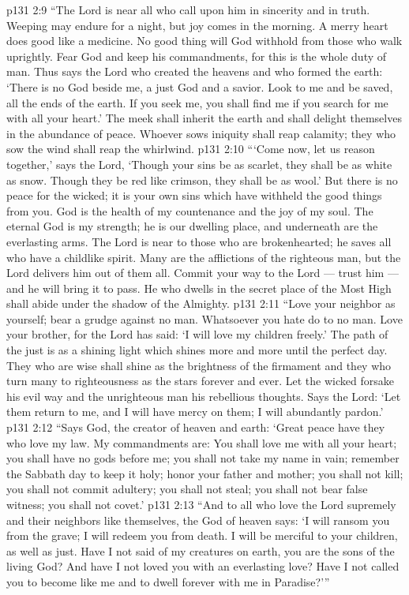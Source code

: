 \vs p131 2:9 “The Lord is near all who call upon him in sincerity and in truth. Weeping may endure for a night, but joy comes in the morning. A merry heart does good like a medicine. No good thing will God withhold from those who walk uprightly. Fear God and keep his commandments, for this is the whole duty of man. Thus says the Lord who created the heavens and who formed the earth: ‘There is no God beside me, a just God and a savior. Look to me and be saved, all the ends of the earth. If you seek me, you shall find me if you search for me with all your heart.’ The meek shall inherit the earth and shall delight themselves in the abundance of peace. Whoever sows iniquity shall reap calamity; they who sow the wind shall reap the whirlwind.
\vs p131 2:10 “‘Come now, let us reason together,’ says the Lord, ‘Though your sins be as scarlet, they shall be as white as snow. Though they be red like crimson, they shall be as wool.’ But there is no peace for the wicked; it is your own sins which have withheld the good things from you. God is the health of my countenance and the joy of my soul. The eternal God is my strength; he is our dwelling place, and underneath are the everlasting arms. The Lord is near to those who are brokenhearted; he saves all who have a childlike spirit. Many are the afflictions of the righteous man, but the Lord delivers him out of them all. Commit your way to the Lord --- trust him --- and he will bring it to pass. He who dwells in the secret place of the Most High shall abide under the shadow of the Almighty.
\vs p131 2:11 “Love your neighbor as yourself; bear a grudge against no man. Whatsoever you hate do to no man. Love your brother, for the Lord has said: ‘I will love my children freely.’ The path of the just is as a shining light which shines more and more until the perfect day. They who are wise shall shine as the brightness of the firmament and they who turn many to righteousness as the stars forever and ever. Let the wicked forsake his evil way and the unrighteous man his rebellious thoughts. Says the Lord: ‘Let them return to me, and I will have mercy on them; I will abundantly pardon.’
\vs p131 2:12 “Says God, the creator of heaven and earth: ‘Great peace have they who love my law. My commandments are: You shall love me with all your heart; you shall have no gods before me; you shall not take my name in vain; remember the Sabbath day to keep it holy; honor your father and mother; you shall not kill; you shall not commit adultery; you shall not steal; you shall not bear false witness; you shall not covet.’
\vs p131 2:13 “And to all who love the Lord supremely and their neighbors like themselves, the God of heaven says: ‘I will ransom you from the grave; I will redeem you from death. I will be merciful to your children, as well as just. Have I not said of my creatures on earth, you are the sons of the living God? And have I not loved you with an everlasting love? Have I not called you to become like me and to dwell forever with me in Paradise?’”
